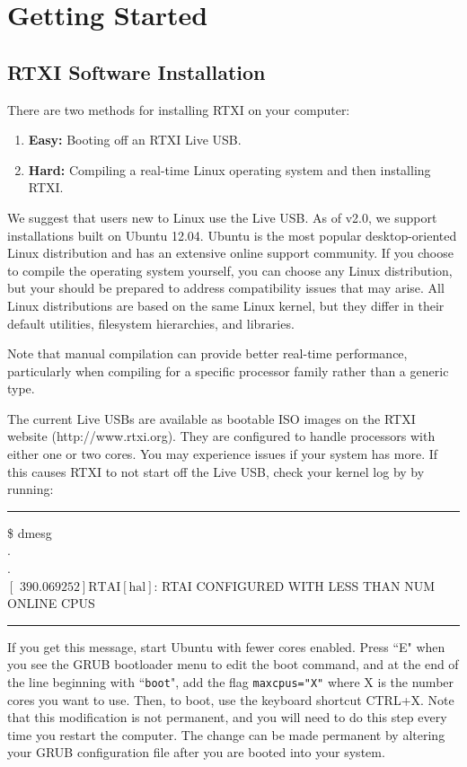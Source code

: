 \chapter{Getting Started}

\section{RTXI Software Installation}
There are two methods for installing RTXI on your computer:
\begin{enumerate}
\item \textbf{Easy:} Booting off an RTXI Live USB.
\item \textbf{Hard:} Compiling a real-time Linux operating system and then installing RTXI.
\end{enumerate}

We suggest that users new to Linux use the Live USB. As of v2.0, we support installations built on Ubuntu 12.04. Ubuntu is the most popular desktop-oriented Linux distribution and has an extensive online support community. If you choose to compile the operating system yourself, you can choose any Linux distribution, but your should be prepared to address compatibility issues that may arise. All Linux distributions are based on the same Linux kernel, but they differ in their default utilities, filesystem hierarchies, and libraries. 

Note that manual compilation can provide better real-time performance, particularly when compiling for a specific processor family rather than a generic type. 

\attention
The current Live USBs are available as bootable ISO images on the RTXI website (http://www.rtxi.org). They are configured to handle processors with either one or two cores. You may experience issues if your system has more. If this causes RTXI to not start off the Live USB, check your kernel log by by running:
\bigskip
\begin{example}
\hrule\bigskip
\$ dmesg\\
.\\
.\\
$\left[\textrm{ 390.069252}\right] \textrm{RTAI}\left[\textrm{hal}\right]$: RTAI CONFIGURED WITH LESS THAN NUM ONLINE CPUS
\bigskip
\hrule\bigskip
\end{example}

If you get this message, start Ubuntu with fewer cores enabled. Press ``E" when you see the GRUB bootloader menu to edit the boot command, and at the end of the line beginning with ``\texttt{boot}", add the flag \texttt{maxcpus="X"} where X is the number cores you want to use. Then, to boot, use the keyboard shortcut CTRL+X. Note that this modification is not permanent, and you will need to do this step every time you restart the computer. The change can be made permanent by altering your GRUB configuration file after you are booted into your system. 